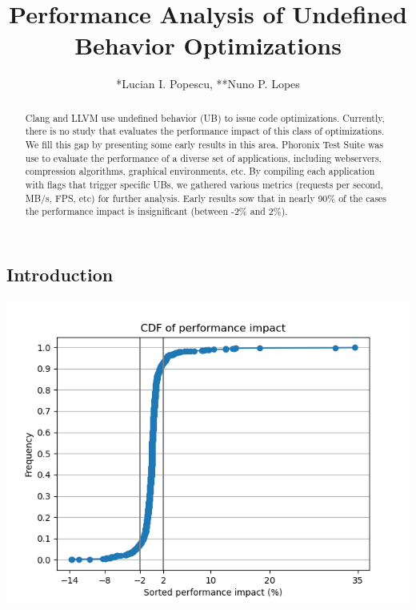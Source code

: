 \documentclass{sciposter}
\title{Performance Analysis of Undefined Behavior Optimizations}
\author{*Lucian I. Popescu, **Nuno P. Lopes}
\institute 
{
*Faculty of Automatic Control and Computer Science,\\
Politehnica University of Bucharest \\
** Instituto Superior Técnico, \\
Universidade de Lisboa
}
\begin{document}





\maketitle

\begin{multicols}{3}

\begin{abstract}
Clang and LLVM use undefined behavior (UB) to issue code optimizations.
Currently, there is no study that evaluates the performance impact of this class
of optimizations. We fill this gap by presenting some early results in this
area. Phoronix Test Suite was use to evaluate the performance of a diverse set
of applications, including webservers, compression algorithms, graphical
environments, etc. By compiling each application with flags that trigger
specific UBs, we gathered various metrics (requests per second, MB/s, FPS,
etc) for further analysis. Early results sow that in nearly 90\% of the cases
the performance impact is insignificant (between -2\% and 2\%).
\end{abstract}

\section{Introduction}
\includegraphics{perf-cdf}


\end{multicols}
\end{document}
